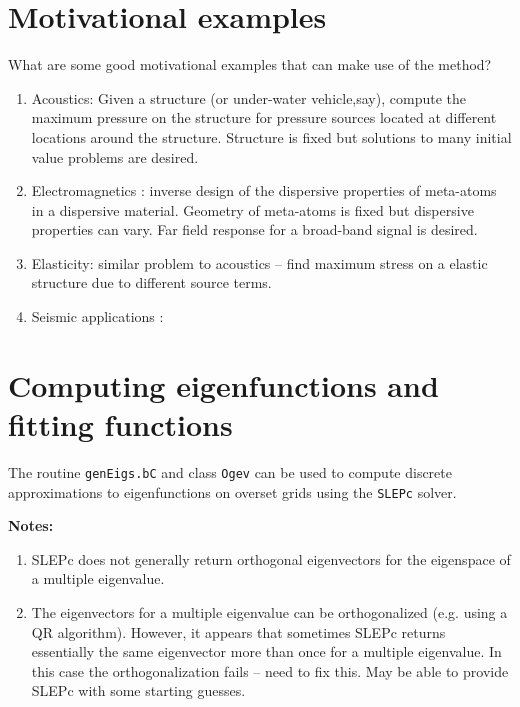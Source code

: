 \section{Motivational examples} 

What are some good motivational examples that can make use of the method?

\begin{enumerate}
  \item Acoustics: Given a structure (or under-water vehicle,say), compute the maximum pressure
    on the structure for pressure sources located at different locations around the structure. Structure is
      fixed but solutions to many initial value problems are desired.
  \item Electromagnetics : inverse design of the dispersive properties of meta-atoms in a dispersive
      material. Geometry of meta-atoms is fixed but dispersive properties can vary. Far field response
      for a broad-band signal is desired.
  \item Elasticity: similar problem to acoustics -- find maximum stress on a elastic structure due
    to different source terms.
  \item Seismic applications : 
\end{enumerate}



\clearpage
\section{Computing eigenfunctions and fitting functions}


The routine {\tt genEigs.bC} and class {\tt Ogev} can be used to compute discrete
approximations to eigenfunctions on overset grids using the {\tt SLEPc} solver.

\mni
\textbf{ Notes:}
\begin{enumerate}
  \item SLEPc does not generally return orthogonal eigenvectors
      for the eigenspace of a multiple eigenvalue. 
  \item The eigenvectors for a multiple eigenvalue can be orthogonalized (e.g. using a QR algorithm).
   However, it appears that sometimes SLEPc 
   returns essentially the same eigenvector more than once for a multiple eigenvalue. In this
   case the  orthogonalization fails -- need to fix this. May be able to provide SLEPc with
   some starting guesses. 
\end{enumerate}

